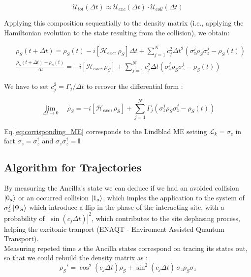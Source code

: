 \documentclass[a4paper,12pt]{article}
\begin{document}
	\begin{equation}
		\mathcal{U}_{tot}(\Delta t) \approx \mathcal{U}_{exc}(\Delta t) \cdot \mathcal{U}_{coll}(\Delta t)
		\label{eq:trotter_suzuki}
	\end{equation}

	Applying this composition sequentially to the density matrix (i.e., applying the Hamiltonian evolution to the state resulting from the collision), we obtain:

	\begin{align}
		&\rho_S \left(t + \Delta t\right) = \rho_S (t) - i \left[\mathcal{H}_{exc}, \rho_S \right]\Delta t + \sum_{j=1}^{N}{c_{j}^{2} \Delta t ^{2} \left( \sigma_{z}^{j} \rho_S \sigma_{z}^{j} - \rho_S (t) \right)} \\
		&\frac{\rho_S \left(t + \Delta t\right) - \rho_S (t)}{\Delta t} = - i \left[\mathcal{H}_{exc}, \rho_S \right] + \sum_{j=1}^{N}{c_{j}^{2} \Delta t \left( \sigma_{z}^{j} \rho_S \sigma_{z}^{j} - \rho_S (t) \right)}
		\label{eq_incremental_ratio}
	\end{align}

	We have to set $ c_{j}^{2} = \Gamma_j / \Delta t  $ to recover the differential form :

	\begin{equation}
		\lim\limits_{\Delta t \rightarrow 0} \quad \dot{\rho_S} = - i \left[\mathcal{H}_{exc}, \rho_S \right] + \sum_{j=1}^{N}{\Gamma_{j} \left( \sigma_{z}^{j} \rho_S \sigma_{z}^{j} - \rho_S (t) \right)}
		\label{eq:corrisponding_ME}
	\end{equation}

	Eq.\eqref{eq:corrisponding_ME} corresponds to the Lindblad ME setting $ \mathcal{L}_k = \sigma_{z} $ in fact $ \sigma_{z} = \sigma_{z}^{\dagger} $ and $ \sigma_{z} \sigma_{z}^{\dagger} = \mathbb{I} $

	\subsection{Algorithm for Trajectories}
	\label{sub:alg_for_traj_QJ}

	By measuring the Ancilla's state we can deduce if we had an avoided collision $ \ket{0_a} $ or an occurred collision $ \ket{1_a} $, which imples the application to the system of $ \sigma_{z}^{j} \ket{\Psi_S} $ which introduce a flip in the phase of the interacting site, with a probability of $ \left| {\sin \left(c_j \Delta t \right)} \right|^2  $, which contributes to the site dephasing process, helping the excitonic tranport (ENAQT - Enviroment Assisted Quantum Transport). \\
	Measuring repeted time $ s $ the Ancilla states correspond on tracing its states out, so that we could rebuild the density matrix as :
	\begin{equation}
		\rho_S' = \cos^{2}{\left(c_{j} \Delta t\right)} \rho_S + \sin^{2}{\left(c_{j} \Delta t\right)} \, \sigma_{z} \rho_S \sigma_{z}
	\end{equation}
\end{document}
